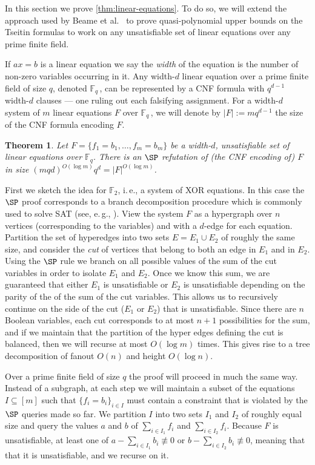 \documentclass[11pt]{article}
\newtheorem{theorem}{Theorem}[section]
\newcommand{\ie}{i.\,e.}
\newcommand{\eg}{e.\,g.}
\begin{document}
In this section we prove \autoref{thm:linear-equations}. 
To do so, we will extend the approach used by Beame et al.~\cite{BeameFIKPPR18} to prove quasi-polynomial upper bounds on the Tseitin formulas to work on any unsatisfiable set of linear equations over any prime finite field. 

If $ax = b$ is a linear equation we say the \emph{width} of the equation is the number of non-zero variables occurring in it.
Any width-$d$ linear equation over a prime finite field of size $q$, denoted $\mathbb{F}_q\,$, can be represented by a CNF formula with $q^{d-1}$ width-$d$ clauses --- one ruling out each falsifying assignment.
For a width-$d$ system of $m$ linear equations $F$ over $\mathbb{F}_q\,$, we will denote by $|F| := mq^{d-1}$ the size of the CNF formula encoding $F$. 

\begin{theorem}\label{thm:SP_gaussian_elim}
	Let $F = \{f_1 = b_1, \ldots, f_m = b_m \}$ be a width-$d$, unsatisfiable set of linear equations over $\mathbb{F}_q$.
	There is an $\SP$ refutation of (the CNF encoding of) $F$ in size $(mqd)^{O(\log m)}q^d = |F|^{O(\log m)}$.
\end{theorem}

First we sketch the idea for $\mathbb{F}_2$, \ie,  a system of XOR equations.
In this case the $\SP$ proof corresponds to a branch decomposition procedure which is commonly used to solve SAT (see, \eg, \cite{LodhaOS19,AlekhnovichR02,Dechter96,Darwiche01}). 
View the system $F$ as a hypergraph over $n$ vertices (corresponding to the variables) and with a $d$-edge for each equation. 
Partition the set of hyperedges into two sets $E = E_1 \cup E_2$ of roughly the same size, and consider the \emph{cut} of vertices that belong to both an edge in $E_1$ and in $E_2$. 
Using the $\SP$ rule we branch on all possible values of the sum of the cut variables in order to isolate $E_1$ and $E_2$. 
Once we know this sum, we are guaranteed that either $E_1$ is unsatisfiable or $E_2$ is unsatisfiable depending on the parity of the of the sum of the cut variables. 
This allows us to recursively continue on the side of the cut ($E_1$ or $E_2$) that is unsatisfiable. 
Since there are $n$ Boolean variables, each cut corresponds to at most $n+1$ possibilities for the sum, and if we maintain that the partition of the hyper edges defining the cut is balanced, then we will recurse at most $O(\log m)$ times. 
This gives rise to a tree decomposition of fanout $O(n)$ and height $O(\log n)$.

Over a prime finite field of size $q$ the proof will proceed in much the same way. 
Instead of a subgraph, at each step we will maintain a subset of the equations $I \subseteq [m]$ such that $\{f_i =b_i \}_{i \in I}$ must contain a constraint that is violated by the $\SP$ queries made so far. We partition $I$ into two sets $I_1$ and $I_2$ of roughly equal size and query the values $a$ and $b$ of $\sum_{i \in I_1} f_i$ and $\sum_{i \in I_2} f_i$. Because $F$ is unsatisfiable, at least one of $a- \sum_{i \in I_1} b_i \not \equiv 0$ or $b- \sum_{i \in I_2} b_i \not \equiv 0$, meaning that that it is unsatisfiable, and we recurse on it. 
\end{document}

